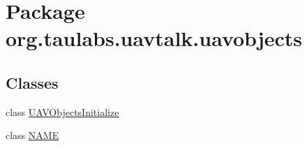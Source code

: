 \hypertarget{namespaceorg_1_1taulabs_1_1uavtalk_1_1uavobjects}{\section{Package org.\-taulabs.\-uavtalk.\-uavobjects}
\label{namespaceorg_1_1taulabs_1_1uavtalk_1_1uavobjects}
}
\subsection*{Classes}
\begin{DoxyCompactItemize}
\item 
class \hyperlink{classorg_1_1taulabs_1_1uavtalk_1_1uavobjects_1_1_u_a_v_objects_initialize}{U\-A\-V\-Objects\-Initialize}
\item 
class \hyperlink{classorg_1_1taulabs_1_1uavtalk_1_1uavobjects_1_1_n_a_m_e}{N\-A\-M\-E}
\end{DoxyCompactItemize}
